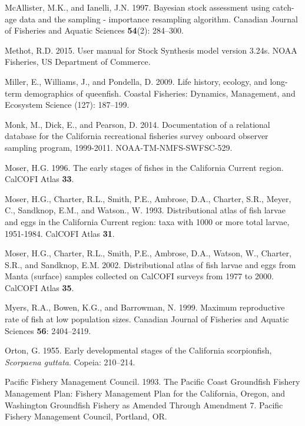 \documentclass[12pt,]{article}
\begin{document}
\hypertarget{ref-McAllister1997}{}
McAllister, M.K., and Ianelli, J.N. 1997. Bayesian stock assessment
using catch-age data and the sampling - importance resampling algorithm.
Canadian Journal of Fisheries and Aquatic Sciences \textbf{54}(2):
284--300.

\hypertarget{ref-Methot2015}{}
Methot, R.D. 2015. User manual for Stock Synthesis model version 3.24s.
NOAA Fisheries, US Department of Commerce.

\hypertarget{ref-Miller2009}{}
Miller, E., Williams, J., and Pondella, D. 2009. Life history, ecology,
and long-term demographics of queenfish. Coastal Fisheries: Dynamics,
Management, and Ecosystem Science (127): 187--199.

\hypertarget{ref-Monk2014}{}
Monk, M., Dick, E., and Pearson, D. 2014. Documentation of a relational
database for the California recreational fisheries survey onboard
observer sampling program, 1999-2011. NOAA-TM-NMFS-SWFSC-529.

\hypertarget{ref-Moser1996}{}
Moser, H.G. 1996. The early stages of fishes in the California Current
region. CalCOFI Atlas \textbf{33}.

\hypertarget{ref-Moser1993}{}
Moser, H.G., Charter, R.L., Smith, P.E., Ambrose, D.A., Charter, S.R.,
Meyer, C., Sandknop, E.M., and Watson., W. 1993. Distributional atlas of
fish larvae and eggs in the California Current region: taxa with 1000 or
more total larvae, 1951-1984. CalCOFI Atlas \textbf{31}.

\hypertarget{ref-Moser2002}{}
Moser, H.G., Charter, R.L., Smith, P.E., Ambrose, D.A., Watson, W.,
Charter, S.R., and Sandknop, E.M. 2002. Distributional atlas of fish
larvae and eggs from Manta (surface) samples collected on CalCOFI
surveys from 1977 to 2000. CalCOFI Atlas \textbf{35}.

\hypertarget{ref-Myers1999}{}
Myers, R.A., Bowen, K.G., and Barrowman, N. 1999. Maximum reproductive
rate of fish at low population sizes. Canadian Journal of Fisheries and
Aquatic Sciences \textbf{56}: 2404--2419.

\hypertarget{ref-Orton1955}{}
Orton, G. 1955. Early developmental stages of the California
scorpionfish, \emph{Scorpaena guttata}. Copeia: 210--214.

\hypertarget{ref-PFMC1993}{}
Pacific Fishery Management Council. 1993. The Pacific Coast Groundfish
Fishery Management Plan: Fishery Management Plan for the California,
Oregon, and Washington Groundfish Fishery as Amended Through Amendment
7. Pacific Fishery Management Council, Portland, OR.
\end{document}
